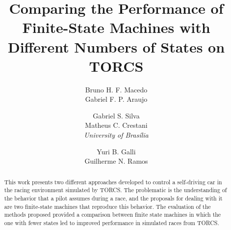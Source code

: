 \documentclass[a4paper]{sbgames}
\title{Comparing the Performance of Finite-State Machines with Different Numbers of States on TORCS}
\author{Bruno H. F. Macedo\\Gabriel F. P. Araujo\\
		\and Gabriel S. Silva\\Matheus C. Crestani\\\textit{University of Bras\'{i}lia}
		\and Yuri B. Galli\\ Guilherme N. Ramos\\
}
\begin{document}
	\maketitle

	\begin{abstract}
		
		This work presents two different approaches developed to control a self-driving car in the racing environment simulated by TORCS. The problematic is the understanding of the behavior that a pilot assumes during a race, and the proposals for dealing with it are two finite-state machines that reproduce this behavior. The evaluation of the methods proposed provided a comparison between finite state machines in which the one with fewer states led to improved performance in simulated races from TORCS.
		
	\end{abstract}

	\keywordlist
	\contactlist
	
	
	
	
	
	

	
	
	
	
\end{document}
